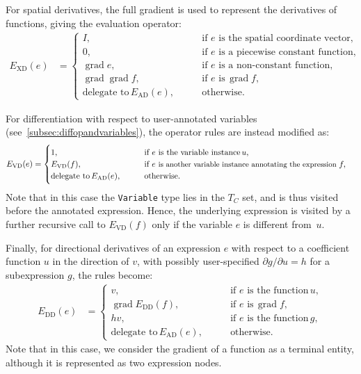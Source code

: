 \documentclass[prodmode,acmtoms]{acmsmall}
\DeclareMathOperator{\Grad}{grad}
\newcommand{\uflc}[1]{\texttt{#1}}
\begin{document}
For spatial derivatives, the full gradient is used to represent the
derivatives of functions, giving the evaluation operator:
\begin{align}
E_{\mathrm{XD}}(e) & =
\begin{cases}
 I,             \qquad & \text{if }e\text{ is the spatial coordinate vector}, \\
 0,             \qquad & \text{if }e\text{ is a piecewise constant function}, \\
 \Grad e,       \qquad & \text{if }e\text{ is a non-constant function}, \\
 \Grad \Grad f, \qquad & \text{if }e\text{ is} \, \Grad f, \\
\text{delegate to} \, E_{\mathrm{AD}}(e),           \qquad & \text{otherwise}.
\end{cases}
\end{align}

For differentiation with respect to user-annotated variables
(see~\ref{subsec:diffopandvariables}), the operator rules are instead
modified as:
\begin{align}
E_{\mathrm{VD}}(e) & =
  \begin{cases}
   1,                        \qquad & \text{if }e\text{ is the variable instance} \, u, \\
   E_{\mathrm{VD}}(f),       \qquad & \text{if }e\text{ \small is another variable instance annotating the expression } f, \\
  \text{delegate to} \, E_{\mathrm{AD}}(e),                    \qquad & \text{otherwise}.
  \end{cases}
\end{align}
Note that in this case the \uflc{Variable} type lies in the $T_C$
set, and is thus visited before the annotated expression. Hence, the
underlying expression is visited by a further recursive call to
$E_{\mathrm{VD}}(f)$ only if the variable $e$ is different from~$u$.

Finally, for directional derivatives of an expression $e$ with respect
to a coefficient function $u$ in the direction of $v$, with possibly
user-specified $\partial g / \partial u = h$ for a subexpression
$g$, the rules become:
\begin{align}
  E_{\mathrm{DD}}(e) & =
  \begin{cases}
    v,             \qquad & \text{if }e\text{ is the function} \, u, \\
    \Grad E_{\mathrm{DD}}(f),  \qquad & \text{if }e\text{ is} \, \Grad f, \\
    h v,           \qquad & \text{if }e\text{ is the function} \, g, \\
    \text{delegate to} \, E_{\mathrm{AD}}(e),           \qquad & \text{otherwise}.
  \end{cases}
\end{align}
Note that in this case, we consider the gradient of a function as a
terminal entity, although it is represented as two expression nodes.
\end{document}
